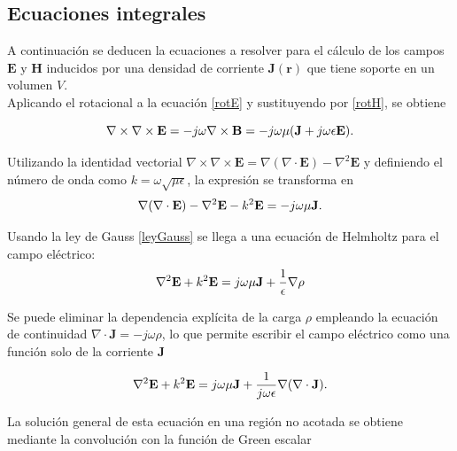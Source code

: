 \documentclass[11pt,a4paper,twoside,pdf]{article}
\numberwithin{equation}{section}
\begin{document}




\subsection{Ecuaciones integrales}


A continuación se deducen la ecuaciones a resolver para el cálculo de los campos $\mathbf{E}$ y $\mathbf{H}$ inducidos por una densidad de corriente $\mathbf{J(r)}$ que tiene soporte en un volumen $V$.\\

Aplicando el rotacional a la ecuación \ref{rotE} y sustituyendo por \ref{rotH}, se obtiene

\begin{equation}
\nabla \times \nabla \times \mathbf{E} = -j\omega\nabla \times \mathbf{B} = -j\omega\mu(\mathbf{J} + j\omega\epsilon\mathbf{E}).
\notag
\end{equation}

Utilizando la identidad vectorial $\nabla \times \nabla \times \mathbf{E} = \nabla(\nabla \cdot \mathbf{E}) - \nabla^2 \mathbf{E}$ y definiendo el número de onda como $k = \omega\sqrt{\mu\epsilon}$, la expresión se transforma en
\begin{equation}
\nabla(\nabla \cdot \mathbf{E}) - \nabla^2 \mathbf{E} - k^2\mathbf{E} = -j\omega\mu\mathbf{J}.
\notag
\end{equation}

Usando la ley de Gauss \ref{leyGauss} se llega a una ecuación de Helmholtz para el campo eléctrico:
\begin{equation}
\nabla^2 \mathbf{E} + k^2 \mathbf{E} = j\omega\mu\mathbf{J} + \frac{1}{\epsilon}\nabla\rho
\notag
\end{equation}

Se puede eliminar la dependencia explícita de la carga $\rho$ empleando la ecuación de continuidad $\nabla \cdot \mathbf{J} = -j\omega\rho$, lo que permite escribir el campo eléctrico como una función solo de la corriente $\mathbf{J}$

\begin{equation}
\nabla^2 \mathbf{E} + k^2 \mathbf{E} = j\omega\mu\mathbf{J} + \frac{1}{j\omega\epsilon}\nabla(\nabla \cdot \mathbf{J}).
\notag
\end{equation}

La solución general de esta ecuación en una región no acotada se obtiene mediante la convolución con la función de Green escalar
\end{document}
